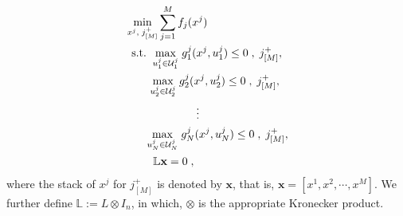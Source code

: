 \documentclass[journal,twoside,web]{ieeecolor}
\begin{document}
\begin{align} \label{dro4}
&\min_{x^j,\; j^+_{[M]}}  \sum_{j=1}^M f_j(x^j)\\
&\;\;\text{s.t.}\;\;\underset{u_1^j\in {\cal U}_1^j}{\max}\; g^j_1(x^j,u^j_1)\leq 0\;,\;j^+_{[M]},\nonumber\\
&\;\;\;\;\;\;\;\;\underset{u_2^j\in {\cal U}_2^j}{\max}\; g^j_2(x^j,u^j_2)\leq 0\;,\;j^+_{[M]},\nonumber\\
& \;\;\;\;\;\;\;\;\;\;\;\;\;\;\;\;\;\;\;\;\;\;\; \vdots \nonumber\\
&\;\;\;\;\;\;\;\underset{u_N^j\in {\cal U}_N^j}{\max}\; g^j_N(x^j,u^j_N)\leq 0\;,\;j^+_{[M]},\nonumber\\
&\;\;\;\;\;\;\;\;\; \mathbb{L}\mathbf{x}=0\;,\nonumber
\end{align}
where the stack of $x^j$ for $j^+_{[M]}$ is denoted by $\mathbf{x}$, that is, $\mathbf{x}=[x^1,x^2,\cdots,x^M]$. We further define $\mathbb{L}:=L\otimes I_n$, in which, $\otimes$ is the appropriate Kronecker product. 

\end{document}
